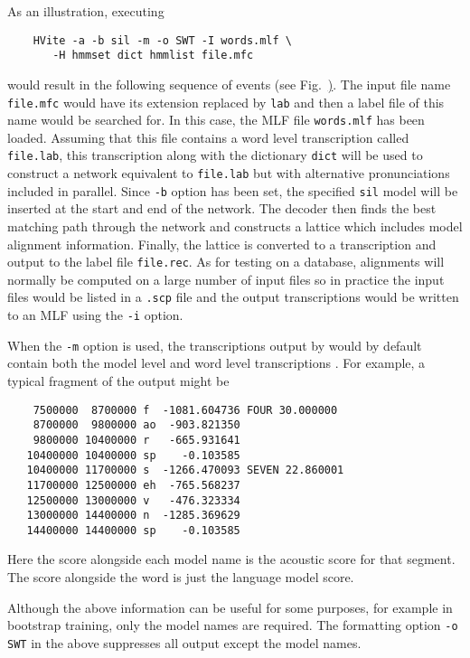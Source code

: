 As an illustration, executing
\begin{verbatim}
    HVite -a -b sil -m -o SWT -I words.mlf \
       -H hmmset dict hmmlist file.mfc
\end{verbatim}
would result in the following sequence of events (see Fig.~\href{f:hvalign}).
The input file name \texttt{file.mfc} would have its extension replaced by
\texttt{lab} and then a label file of this name would be searched for.
In this case, the MLF file \texttt{words.mlf} has been loaded. 
Assuming that this file contains a word level transcription called
\texttt{file.lab}, this transcription along with the dictionary \texttt{dict}
will be used to construct a network equivalent to \texttt{file.lab}
but with alternative pronunciations included in parallel.  Since \texttt{-b}
option has been set, the specified \texttt{sil} model will be inserted
at the start and end of the network.  The decoder then finds the best
matching path through the network and constructs a lattice which
includes model alignment information.  Finally, the lattice is converted
to a transcription and output to the label file \texttt{file.rec}.
As for testing on a database, alignments will normally be computed on
a large number of input files so in practice the input files would be listed
in a \texttt{.scp} file and the output transcriptions would be written
to an MLF using the \texttt{-i} option.

When the \texttt{-m} option is used, the transcriptions output by  
would by default contain both the model level and 
word level transcriptions
.
For example, a typical fragment of the output might be
\begin{verbatim}
    7500000  8700000 f  -1081.604736 FOUR 30.000000
    8700000  9800000 ao  -903.821350
    9800000 10400000 r   -665.931641
   10400000 10400000 sp    -0.103585
   10400000 11700000 s  -1266.470093 SEVEN 22.860001
   11700000 12500000 eh  -765.568237
   12500000 13000000 v   -476.323334
   13000000 14400000 n  -1285.369629
   14400000 14400000 sp    -0.103585
\end{verbatim}
Here the score alongside each model name is the acoustic score for that segment.
The score alongside the word is just the language model score.

Although the above information can be useful for some purposes, for example
in bootstrap training, only the model names are required.
The formatting option \texttt{-o SWT} in the above suppresses all output
except the model names.\index{decoder!output formatting}

